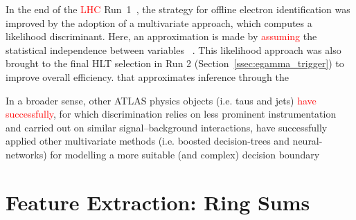 In the end of the \textcolor{red}{LHC} Run~1~\cite{PERF-2016-01}, the strategy for offline electron identification was improved by the adoption of a multivariate approach, which computes a likelihood discriminant. Here, an approximation is made by \textcolor{red}{assuming} the statistical independence between variables ~\cite{kendalls_vol2b}. This likelihood approach was also brought to the final HLT selection in Run 2 (Section~\ref{ssec:egamma_trigger}) to improve overall efficiency. that approximates inference through the




In a broader sense, other ATLAS physics objects (i.e. taus and jets) \textcolor{red}{have successfully}, for
which discrimination relies on less prominent instrumentation and carried out on
similar signal--background interactions, have successfully applied other
multivariate methods (i.e. boosted decision-trees and neural-networks) for
modelling a more suitable (and complex) decision boundary

\section{Feature Extraction: Ring Sums} %

